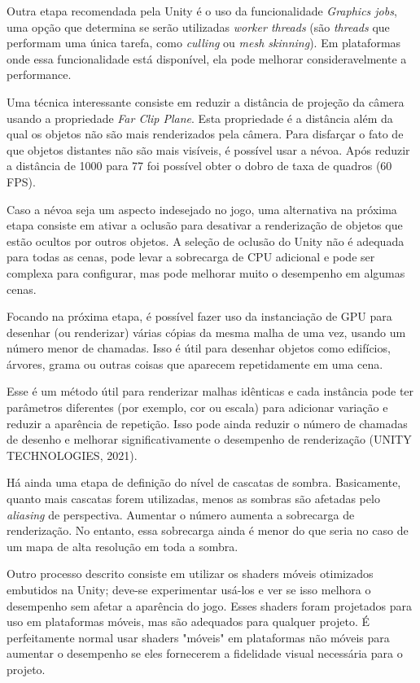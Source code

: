 Outra etapa recomendada pela Unity é o uso da funcionalidade \textit{Graphics jobs}, uma opção que determina se serão utilizadas \textit{worker threads} (são \textit{threads} que performam uma única tarefa, como \textit{culling} ou \textit{mesh skinning}). Em plataformas onde essa funcionalidade está disponível, ela pode melhorar consideravelmente a performance.

Uma técnica interessante consiste em reduzir a distância de projeção da câmera usando a propriedade \textit{Far Clip Plane}. Esta propriedade é a distância além da qual os objetos não são mais renderizados pela câmera. Para disfarçar o fato de que objetos distantes não são mais visíveis, é possível usar a névoa. Após reduzir a distância de 1000 para 77 foi possível obter o dobro de taxa de quadros (60 FPS).

Caso a névoa seja um aspecto indesejado no jogo, uma alternativa na próxima etapa consiste em ativar a oclusão para desativar a renderização de objetos que estão ocultos por outros objetos. A seleção de oclusão do Unity não é adequada para todas as cenas, pode levar a sobrecarga de CPU adicional e pode ser complexa para configurar, mas pode melhorar muito o desempenho em algumas cenas.

Focando na próxima etapa, é possível fazer uso da instanciação de GPU para desenhar (ou renderizar) várias cópias da mesma malha de uma vez, usando um número menor de chamadas. Isso é útil para desenhar objetos como edifícios, árvores, grama ou outras coisas que aparecem repetidamente em uma cena.

Esse é um método útil para renderizar malhas idênticas e cada instância pode ter parâmetros diferentes (por exemplo, cor ou escala) para adicionar variação e reduzir a aparência de repetição. Isso pode ainda reduzir o número de chamadas de desenho e melhorar significativamente o desempenho de renderização (UNITY TECHNOLOGIES, 2021)\nocite{unity2Tech2021}.

Há ainda uma etapa de definição do nível de cascatas de sombra. Basicamente, quanto mais cascatas forem utilizadas, menos as sombras são afetadas pelo \textit{aliasing} de perspectiva. Aumentar o número aumenta a sobrecarga de renderização. No entanto, essa sobrecarga ainda é menor do que seria no caso de um mapa de alta resolução em toda a sombra.

Outro processo descrito consiste em utilizar os shaders móveis otimizados embutidos na Unity; deve-se experimentar usá-los e ver se isso melhora o desempenho sem afetar a aparência do jogo. Esses shaders foram projetados para uso em plataformas móveis, mas são adequados para qualquer projeto. É perfeitamente normal usar shaders "móveis" em plataformas não móveis para aumentar o desempenho se eles fornecerem a fidelidade visual necessária para o projeto.
